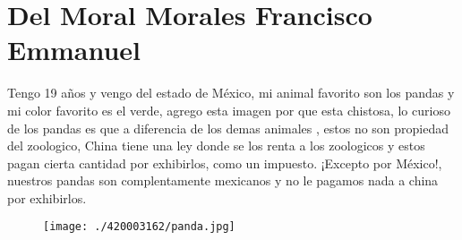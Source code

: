 \chapter{Del Moral Morales Francisco Emmanuel}
Tengo 19 años y vengo del estado de México, mi animal favorito son los pandas y mi color favorito es el verde, agrego esta imagen por que esta chistosa, lo curioso de los pandas es que a diferencia de los demas animales , estos no son propiedad del zoologico, China tiene una ley donde se los renta a los zoologicos y estos pagan cierta cantidad por exhibirlos, como un impuesto. ¡Excepto por México!, nuestros pandas son complentamente mexicanos y no le pagamos nada a china por exhibirlos.
\begin{figure}[H] %
  \begin{center}                                                                
    \texttt{[image: ./420003162/panda.jpg]}                                                                             
  \end{center}                                                                  
\end{figure}  


